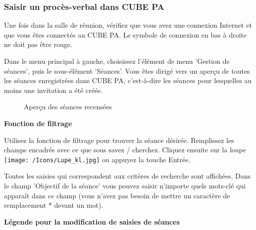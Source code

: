 \subsubsection{Saisir un procès-verbal dans CUBE PA}

Une fois dans la salle de réunion, vérifiez que vous avez une connexion Internet et que vous êtes connectés au CUBE PA. Le symbole de connexion en bas à droite ne doit pas être rouge.

\vspace{\baselineskip}

Dans le menu principal à gauche, choisissez l'élément de menu 'Gestion de séances', puis le sous-élément 'Séances'. Vous êtes dirigé vers un aperçu de toutes les séances enregistrées dans CUBE PA, c'est-à-dire les séances pour lesquelles au moins une invitation a été créée. 

\begin{figure}[H]
\caption{Aperçu des séances recensées}
\end{figure}

\textbf{Fonction de filtrage}

Utilisez la fonction de filtrage pour trouver la séance désirée. Remplissez les champs encadrés avec ce que sous savez / cherchez. Cliquez ensuite sur la loupe \texttt{[image: /Icons/Lupe\_kl.jpg]} ou appuyez la touche Entrée.

\vspace{\baselineskip}

Toutes les saisies qui correspondent aux critères de recherche sont affichées. Dans le champ 'Objectif de la séance' vous pouvez saisir n'importe quels mots-clé qui apparaît dans ce champ (vous n'avez pas besoin de mettre un caractère de remplacement * devant un mot).

\vspace{\baselineskip}

\textbf{Légende pour la modification de saisies de séances}

